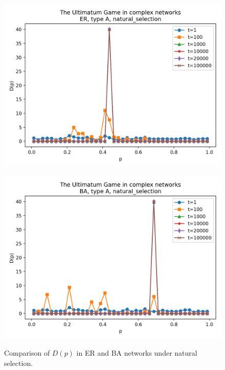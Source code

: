 \begin{figure}[h!]
    \centering
    \setlength{\tabcolsep}{2pt}
    \begin{minipage}[t]{0.48\textwidth}
        \centering
        \includegraphics[width=\textwidth]{images/TASK1/Dp_ER_A_natural_selection.png}
        \label{fig:ER_Dp}
    \end{minipage}
    \hfill
    \begin{minipage}[t]{0.48\textwidth}
        \centering
        \includegraphics[width=\textwidth]{images/TASK1/Dp_BA_A_natural_selection.png}
        \label{fig:BA_Dp}
    \end{minipage}
    \caption{Comparison of $D(p)$ in ER and BA networks under natural selection.}
    \label{fig:ER_BA_Dp}
\end{figure}

